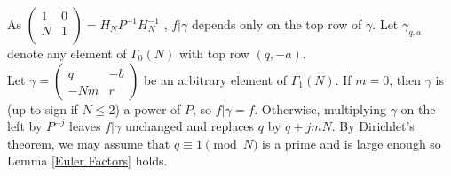 \documentclass[a4paper,12.5pt]{amsart}
\theoremstyle{definition}
\theoremstyle{remark}
\begin{document}
 As $ \begin{pmatrix}
1 & 0 \\
N & 1 \\
\end{pmatrix} = H_N P^{-1} H_N^{-1} $  ,  $ f| \gamma$ depends only on the top row of $\gamma$. Let $\gamma_{q,a}$ denote any element of $\Gamma_0 (N)$ with top row $(q, -a)$. \\
Let $\gamma= \begin{pmatrix}
 q  & -b \\
 -Nm & r
\end{pmatrix}$ be an arbitrary element of $\Gamma_1(N)$. If $m=0$, then $\gamma$ is (up to sign if $N \leq 2$) a power of $P$, so $f|\gamma=f$. Otherwise, multiplying $\gamma$ on the left by $P^{-j}$ leaves $f|\gamma$ unchanged and replaces $q$ by $q+jmN$. By Dirichlet's theorem, we may assume that $q \equiv 1\pmod{N} $ is a prime and is large enough so Lemma \ref{Euler Factors} holds.   \\ \\
                
\end{document}
